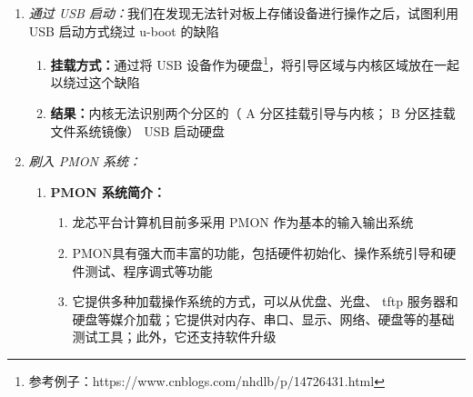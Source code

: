 \begin{enumerate}
	\item \textit{通过 USB 启动：}我们在发现无法针对板上存储设备进行操作之后，试图利用 USB 启动方式绕过 u-boot 的缺陷
	\begin{enumerate}
		\item \textbf{挂载方式：}通过将 USB 设备作为硬盘\footnote{参考例子：https://www.cnblogs.com/nhdlb/p/14726431.html}，将引导区域与内核区域放在一起以绕过这个缺陷
		\item \textbf{结果：}内核无法识别两个分区的（ A 分区挂载引导与内核； B 分区挂载文件系统镜像） USB 启动硬盘
	\end{enumerate}
	\item \textit{刷入 PMON 系统：}
	\begin{enumerate}
		\item \textbf{PMON 系统简介：}
		\begin{enumerate}
			\item 龙芯平台计算机目前多采用 PMON 作为基本的输入输出系统
			\item PMON具有强大而丰富的功能，包括硬件初始化、操作系统引导和硬件测试、程序调式等功能
			\item 它提供多种加载操作系统的方式，可以从优盘、光盘、 tftp 服务器和硬盘等媒介加载；它提供对内存、串口、显示、网络、硬盘等的基础测试工具；此外，它还支持软件升级
		\end{enumerate}
	\end{enumerate}
\end{enumerate}